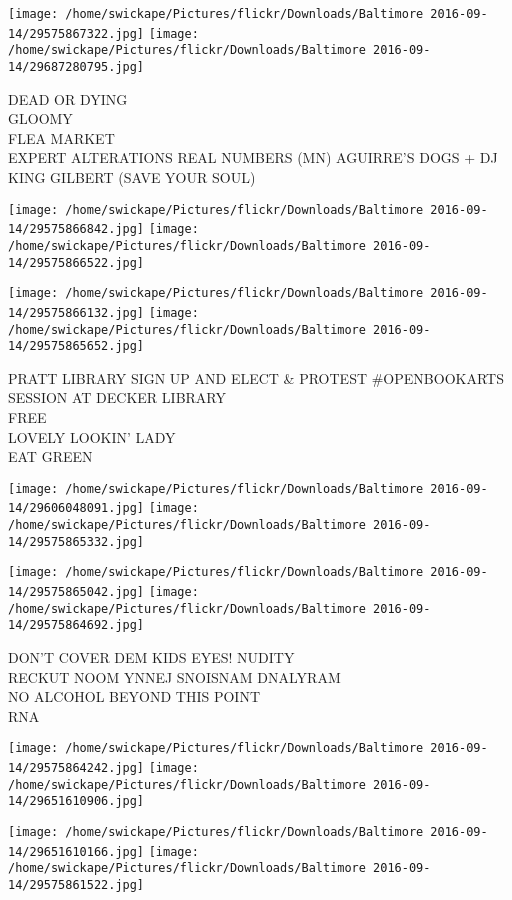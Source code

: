 \documentclass[10pt,letterpaper]{article}
\begin{document}
\texttt{[image: /home/swickape/Pictures/flickr/Downloads/Baltimore 2016-09-14/29575867322.jpg]}
\texttt{[image: /home/swickape/Pictures/flickr/Downloads/Baltimore 2016-09-14/29687280795.jpg]}

DEAD OR DYING\\
GLOOMY\\
FLEA MARKET\\
EXPERT ALTERATIONS REAL NUMBERS (MN) AGUIRRE'S DOGS + DJ KING GILBERT (SAVE YOUR SOUL)
\pagebreak

\texttt{[image: /home/swickape/Pictures/flickr/Downloads/Baltimore 2016-09-14/29575866842.jpg]}
\texttt{[image: /home/swickape/Pictures/flickr/Downloads/Baltimore 2016-09-14/29575866522.jpg]}

\texttt{[image: /home/swickape/Pictures/flickr/Downloads/Baltimore 2016-09-14/29575866132.jpg]}
\texttt{[image: /home/swickape/Pictures/flickr/Downloads/Baltimore 2016-09-14/29575865652.jpg]}

PRATT LIBRARY SIGN UP AND ELECT \& PROTEST \#OPENBOOKARTS SESSION AT DECKER LIBRARY\\
FREE\\
LOVELY LOOKIN' LADY\\
EAT GREEN
\pagebreak

\texttt{[image: /home/swickape/Pictures/flickr/Downloads/Baltimore 2016-09-14/29606048091.jpg]}
\texttt{[image: /home/swickape/Pictures/flickr/Downloads/Baltimore 2016-09-14/29575865332.jpg]}

\texttt{[image: /home/swickape/Pictures/flickr/Downloads/Baltimore 2016-09-14/29575865042.jpg]}
\texttt{[image: /home/swickape/Pictures/flickr/Downloads/Baltimore 2016-09-14/29575864692.jpg]}

DON'T COVER DEM KIDS EYES!  NUDITY\\
RECKUT NOOM YNNEJ SNOISNAM DNALYRAM\\
NO ALCOHOL BEYOND THIS POINT\\
RNA
\pagebreak

\texttt{[image: /home/swickape/Pictures/flickr/Downloads/Baltimore 2016-09-14/29575864242.jpg]}
\texttt{[image: /home/swickape/Pictures/flickr/Downloads/Baltimore 2016-09-14/29651610906.jpg]}

\texttt{[image: /home/swickape/Pictures/flickr/Downloads/Baltimore 2016-09-14/29651610166.jpg]}
\texttt{[image: /home/swickape/Pictures/flickr/Downloads/Baltimore 2016-09-14/29575861522.jpg]}
\end{document}
